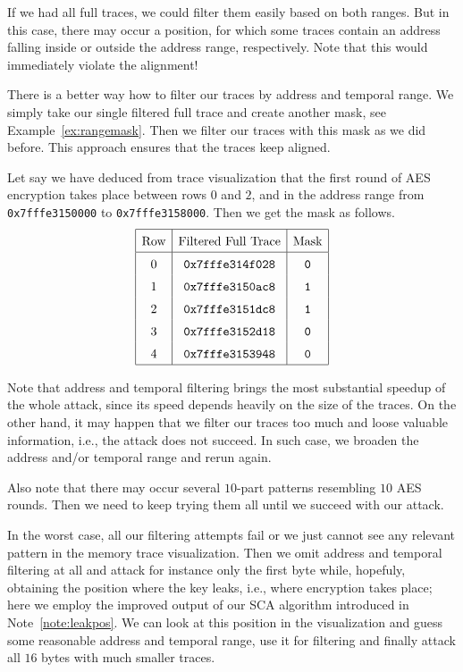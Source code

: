		If we had all full traces, we could filter them easily based on both ranges. But in this case, there may occur a position, for which some traces contain an address falling inside or outside the address range, respectively. Note that this would immediately violate the alignment!
		
		\begin{remark}
		\label{rem:rangemask}
			There is a better way how to filter our traces by address and temporal range. We simply take our single filtered full trace and create another mask, see Example~\ref{ex:rangemask}. Then we filter our traces with this mask as we did before. This approach ensures that the traces keep aligned.
		\end{remark}
		
		\begin{example}
		\label{ex:rangemask}
			Let say we have deduced from trace visualization that the first round of AES encryption takes place between rows $0$ and $2$, and in the address range from {\tt 0x7fffe3150000} to {\tt 0x7fffe3158000}. Then we get the mask as follows.
			\[
			\arraycolsep=.5em\def\arraystretch{1.5}
				\begin{array}{|c|c|c|}
					\hline
					\textnormal{Row} & \textnormal{Filtered Full Trace} & \textnormal{Mask} \\
					\hline
					0 & {\tt 0x7fffe314f028} & {\tt 0} \\
					1 & {\tt 0x7fffe3150ac8} & {\tt 1} \\
					2 & {\tt 0x7fffe3151dc8} & {\tt 1} \\
					3 & {\tt 0x7fffe3152d18} & {\tt 0} \\
					4 & {\tt 0x7fffe3153948} & {\tt 0} \\
					\hline
				\end{array}
			\]
		\end{example}
		
		Note that address and temporal filtering brings the most substantial speedup of the whole attack, since its speed depends heavily on the size of the traces. On the other hand, it may happen that we filter our traces too much and loose valuable information, i.e., the attack does not succeed. In such case, we broaden the address and/or temporal range and rerun again.
		
		Also note that there may occur several $10$-part patterns resembling $10$ AES rounds. Then we need to keep trying them all until we succeed with our attack.
		
		In the worst case, all our filtering attempts fail or we just cannot see any relevant pattern in the memory trace visualization. Then we omit address and temporal filtering at all and attack for instance only the first byte while, hopefuly, obtaining the position where the key leaks, i.e., where encryption takes place; here we employ the improved output of our SCA algorithm introduced in Note~\ref{note:leakpos}. We can look at this position in the visualization and guess some reasonable address and temporal range, use it for filtering and finally attack all $16$ bytes with much smaller traces.


